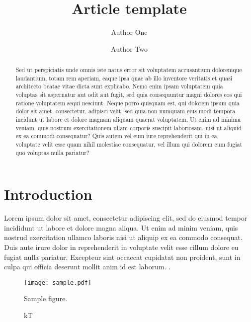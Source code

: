 \documentclass{nextex10}
\begin{document}
\title{Article template}


\author{Author One}

\author{Author Two}

\begin{abstract}
    Sed ut perspiciatis unde omnis iste natus error sit voluptatem accusantium doloremque laudantium, totam rem aperiam, eaque ipsa quae ab illo inventore veritatis et quasi architecto beatae vitae dicta sunt explicabo. 
    Nemo enim ipsam voluptatem quia voluptas sit aspernatur aut odit aut fugit, sed quia consequuntur magni dolores eos qui ratione voluptatem sequi nesciunt. 
    Neque porro quisquam est, qui dolorem ipsum quia dolor sit amet, consectetur, adipisci velit, sed quia non numquam eius modi tempora incidunt ut labore et dolore magnam aliquam quaerat voluptatem. 
    Ut enim ad minima veniam, quis nostrum exercitationem ullam corporis suscipit laboriosam, nisi ut aliquid ex ea commodi consequatur? 
    Quis autem vel eum iure reprehenderit qui in ea voluptate velit esse quam nihil molestiae consequatur, vel illum qui dolorem eum fugiat quo voluptas nulla pariatur?
\end{abstract}


\section{Introduction} \label{sec:intro}
Lorem ipsum dolor sit amet, consectetur adipiscing elit, sed do eiusmod tempor incididunt ut labore et dolore magna aliqua. 
Ut enim ad minim veniam, quis nostrud exercitation ullamco laboris nisi ut aliquip ex ea commodo consequat. 
Duis aute irure dolor in reprehenderit in voluptate velit esse cillum dolore eu fugiat nulla pariatur. 
Excepteur sint occaecat cupidatat non proident, sunt in culpa qui officia deserunt mollit anim id est laborum.
\citep{Luger2019}.

\begin{figure}[t!]
    \begin{centering}
    \texttt{[image: sample.pdf]}
    \caption{kT}{%
        Sample figure.
        \label{fig:sample}
    }
    \end{centering}
\end{figure}

{}

\end{document}

